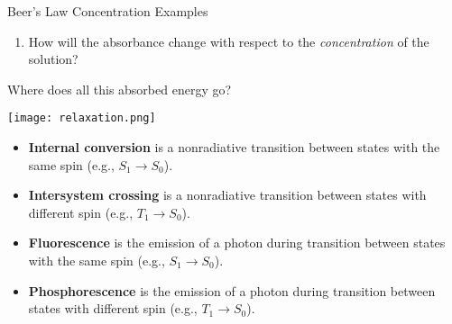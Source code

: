\documentclass[notes=show]{beamer}
\begin{document}
\begin{frame}[t]{Beer's Law Concentration Examples}
	\begin{enumerate}
		\item How will the absorbance change with respect to the
			\emph{concentration} of the solution?
	\end{enumerate}
\end{frame}


\begin{frame}[allowframebreaks]{Where does all this absorbed energy go?}
	\begin{center}
		\texttt{[image: relaxation.png]}
	\end{center}

	\framebreak

	\begin{itemize}
		\item \textbf{Internal conversion} is a \alert{nonradiative}
			transition between states with the same spin (e.g.,
			$S_1 \rightarrow S_0$).
		\item \textbf{Intersystem crossing} is a \alert{nonradiative}
			transition between states with different spin (e.g.,
			$T_1 \rightarrow S_0$).
		\item \textbf{Fluorescence} is the \alert{emission} of a photon
			during transition between states with the same spin
			(e.g., $S_1 \rightarrow S_0$).
		\item \textbf{Phosphorescence} is the \alert{emission} of a
			photon during transition between states with different
			spin (e.g., $T_1 \rightarrow S_0$).
	\end{itemize}
\end{frame}

\end{document}
